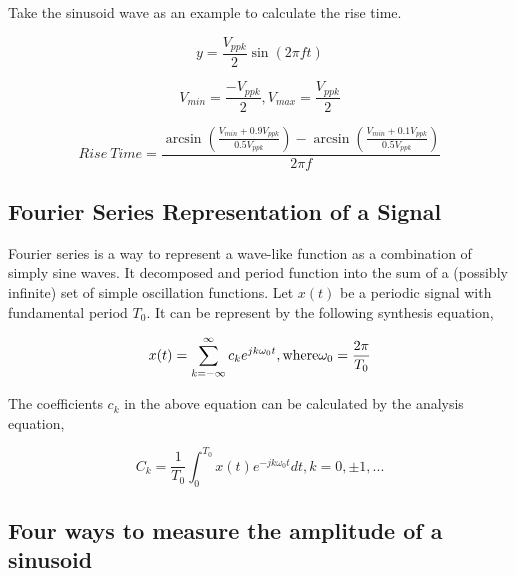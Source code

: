 \documentclass{article}
\begin{document}
Take the sinusoid wave as an example to calculate the rise time.

$$y=\frac{V_{ppk}}{2}\sin(2\pi ft)$$

$$V_{min}=\frac{-V_{ppk}}{2},V_{max}=\frac{V_{ppk}}{2}$$

$$Rise\ Time=\frac{\arcsin\left(\frac{V_{min}+0.9V_{ppk}}{0.5V_{ppk}}\right)-\arcsin\left(\frac{V_{min}+0.1V_{ppk}}{0.5V_{ppk}}\right)}{2\pi f}$$

\subsection{Fourier Series Representation of a Signal}

Fourier series is a way to represent a wave-like function as a combination of simply sine waves. It decomposed and period function into the sum of a (possibly infinite) set of simple oscillation functions.
Let $x(t)$ be a periodic signal with fundamental period $T_0$. It can be represent by the following synthesis equation,

$$x(t)=\sum_{k=-\infty}^{\infty}c_ke^{jk\omega_0t}, {\rm where} \omega_0=\frac{2\pi}{T_0}$$

The coefficients $c_k$ in the above equation can be calculated by the analysis equation,

$$C_k=\frac{1}{T_0}\int_0^{T_0}x(t)e^{-jk\omega_0t}dt,k=0,\pm 1,...$$

\subsection{Four ways to measure the amplitude of a sinusoid}
\end{document}
